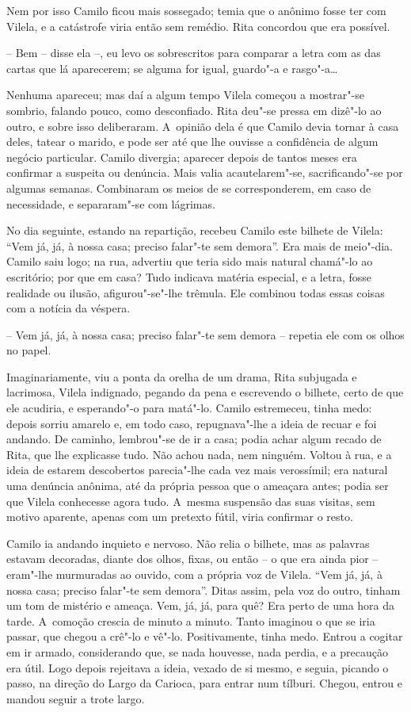Nem por isso Camilo ficou mais sossegado; temia que o anônimo fosse ter
com Vilela, e a catástrofe viria então sem remédio. Rita concordou que
era possível.

-- Bem -- disse ela --, eu levo os sobrescritos para comparar a letra
com as das cartas que lá aparecerem; se alguma for igual, guardo"-a e
rasgo"-a\ldots{}

Nenhuma apareceu; mas daí a algum tempo Vilela começou a mostrar"-se
sombrio, falando pouco, como desconfiado. Rita deu"-se pressa em dizê"-lo
ao outro, e sobre isso deliberaram. A~opinião dela é que Camilo devia
tornar à casa deles, tatear o marido, e pode ser até que lhe ouvisse a
confidência de algum negócio particular. Camilo divergia; aparecer
depois de tantos meses era confirmar a suspeita ou denúncia. Mais valia
acautelarem"-se, sacrificando"-se por algumas semanas. Combinaram os meios
de se corresponderem, em caso de necessidade, e separaram"-se com
lágrimas.

No dia seguinte, estando na repartição, recebeu Camilo este bilhete de
Vilela: ``Vem já, já, à nossa casa; preciso falar"-te sem demora''. Era
mais de meio"-dia. Camilo saiu logo; na rua, advertiu que teria sido mais
natural chamá"-lo ao escritório; por que em casa? Tudo indicava matéria
especial, e a letra, fosse realidade ou ilusão, afigurou"-se"-lhe trêmula.
Ele combinou todas essas coisas com a notícia da véspera.

-- Vem já, já, à nossa casa; preciso falar"-te sem demora -- repetia ele
com os olhos no papel.

Imaginariamente, viu a ponta da orelha de um drama, Rita subjugada e
lacrimosa, Vilela indignado, pegando da pena e escrevendo o bilhete,
certo de que ele acudiria, e esperando"-o para matá"-lo. Camilo
estremeceu, tinha medo: depois sorriu amarelo e, em todo caso,
repugnava"-lhe a ideia de recuar e foi andando. De caminho, lembrou"-se de
ir a casa; podia achar algum recado de Rita, que lhe explicasse tudo.
Não achou nada, nem ninguém. Voltou à rua, e a ideia de estarem
descobertos parecia"-lhe cada vez mais verossímil; era natural uma
denúncia anônima, até da própria pessoa que o ameaçara antes; podia ser
que Vilela conhecesse agora tudo. A~mesma suspensão das suas visitas,
sem motivo aparente, apenas com um pretexto fútil, viria confirmar o
resto.

Camilo ia andando inquieto e nervoso. Não relia o bilhete, mas as
palavras estavam decoradas, diante dos olhos, fixas, ou então -- o que
era ainda pior -- eram"-lhe murmuradas ao ouvido, com a própria voz de
Vilela. ``Vem já, já, à nossa casa; preciso falar"-te sem demora''. Ditas
assim, pela voz do outro, tinham um tom de mistério e ameaça. Vem, já,
já, para quê? Era perto de uma hora da tarde. A~comoção crescia de
minuto a minuto. Tanto imaginou o que se iria passar, que chegou a
crê"-lo e vê"-lo. Positivamente, tinha medo. Entrou a cogitar em ir
armado, considerando que, se nada houvesse, nada perdia, e a precaução
era útil. Logo depois rejeitava a ideia, vexado de si mesmo, e seguia,
picando o passo, na direção do Largo da Carioca, para entrar num
tílburi. Chegou, entrou e mandou seguir a trote largo.

